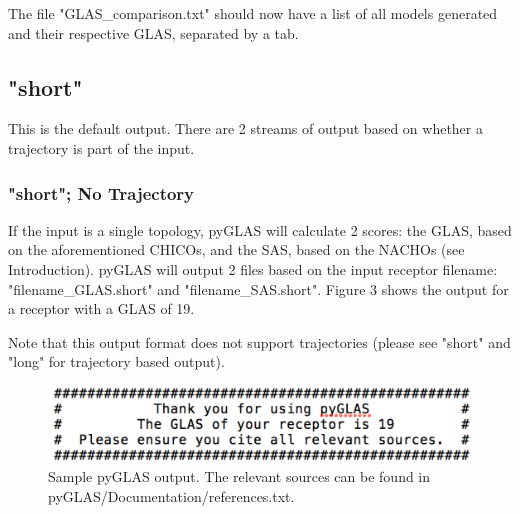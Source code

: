 \documentclass[12pt]{article}
\begin{document}

The file "GLAS\_comparison.txt" should now have a list of all models generated and their respective GLAS, separated by a tab.

\subsection{"short"}
This is the default output. There are 2 streams of output based on whether a trajectory is part of the input.

\subsubsection{"short"; No Trajectory}
If the input is a single topology, pyGLAS will calculate 2 scores: the GLAS, based on the aforementioned CHICOs, and the SAS, based on the NACHOs (see Introduction). pyGLAS will output 2 files based on the input receptor filename: "filename\_GLAS.short" and "filename\_SAS.short". Figure 3 shows the output for a receptor with a GLAS of 19.

Note that this output format does not support trajectories (please see "short" and "long" for trajectory based output).

\begin{figure}[!ht]
	\centering
	\includegraphics[scale = 0.65]{pyGLAS_shortOutput.png}
	\caption{Sample pyGLAS output. The relevant sources can be found in pyGLAS/Documentation/references.txt.}
\end{figure}
\end{document}
